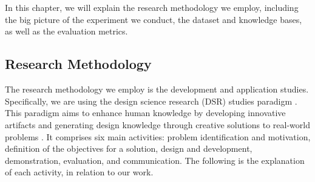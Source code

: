 \chapter{\babTiga}
\label{bab:3}

In this chapter, we will explain the research methodology we employ, including the big picture of the experiment we conduct, the dataset and knowledge bases, as well as the evaluation metrics.

\section{Research Methodology}
The research methodology we employ is the development and application studies. Specifically, we are using the design science research (DSR) studies paradigm \citep{vomBrocke2020}. This paradigm aims to enhance human knowledge by developing innovative artifacts and generating design knowledge through creative solutions to real-world problems \citep{hevner2004design}. It comprises six main activities: problem identification and motivation, definition of the objectives for a solution, design and development, demonstration, evaluation, and communication. The following is the explanation of each activity, in relation to our work.
